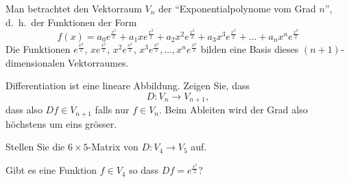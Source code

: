 Man betrachtet den Vektorraum $V_n$ der ``Exponentialpolynome vom Grad $n$'',
d.~h.~der Funktionen der Form
\[
f(x)=
a_0e^{\frac{x^2}2}
+a_1xe^{\frac{x^2}2}
+a_2x^2e^{\frac{x^2}2}
+a_3x^3e^{\frac{x^2}2}
+\dots
+a_nx^ne^{\frac{x^2}2}
\]
Die Funktionen
$e^{\frac{x^2}2}$,
$xe^{\frac{x^2}2}$,
$x^2e^{\frac{x^2}2}$,
$x^3e^{\frac{x^2}2},\dots,
x^ne^{\frac{x^2}2}$
bilden eine Basis dieses $(n+1)$-dimensionalen Vektorraumes.
\begin{teilaufgaben}
\item Differentiation
ist eine lineare Abbildung.
Zeigen Sie, dass
\[
D\colon V_n\to V_{n+1},
\]
dass also $Df\in V_{n+1}$ falls nur $f\in V_n$. Beim Ableiten wird der Grad
also höchstens um eins grösser.
\item Stellen Sie die $6\times 5$-Matrix von $D\colon V_4\to V_5$ auf.
\item Gibt es eine Funktion $f\in V_4$ so dass $Df=e^{\frac{x^2}2}$?
\end{teilaufgaben}


